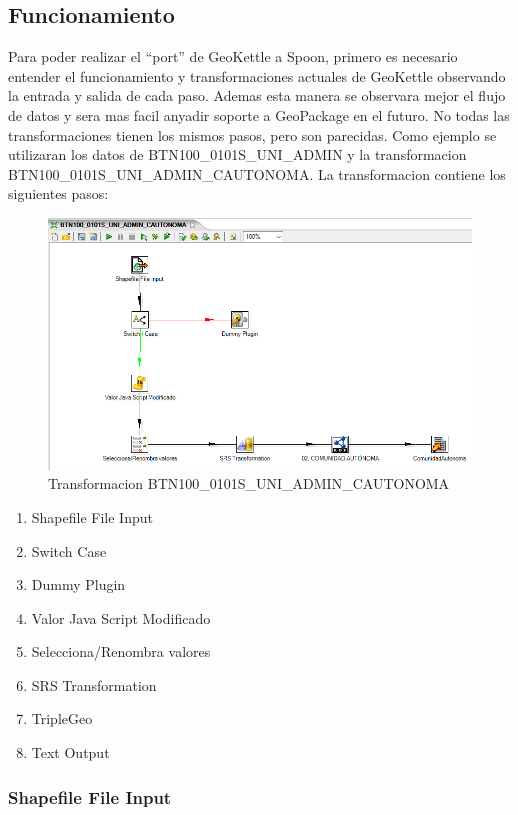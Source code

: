 \newpage
\subsection{Funcionamiento}

Para poder realizar el ``port'' de GeoKettle a Spoon, primero es necesario entender el funcionamiento y
transformaciones actuales de GeoKettle observando la entrada y salida de cada paso. Ademas esta manera se
observara mejor el flujo de datos y sera mas facil anyadir soporte a GeoPackage en el futuro. No todas las
transformaciones tienen los mismos pasos, pero son parecidas. Como ejemplo se utilizaran los datos de
BTN100\_0101S\_UNI\_ADMIN y la transformacion BTN100\_0101S\_UNI\_ADMIN\_CAUTONOMA. La transformacion contiene
los siguientes pasos:

\begin{figure}[H]
    \includegraphics[width=\textwidth]{images/CCAA.png}
    \centering
    \caption{Transformacion BTN100\_0101S\_UNI\_ADMIN\_CAUTONOMA}
    \label{fig:CCAA}
\end{figure}


\begin{enumerate}
    \item Shapefile File Input
    \item Switch Case
    \item Dummy Plugin
    \item Valor Java Script Modificado
    \item Selecciona/Renombra valores
    \item SRS Transformation
    \item TripleGeo
    \item Text Output
\end{enumerate}


\subsubsection{Shapefile File Input}

